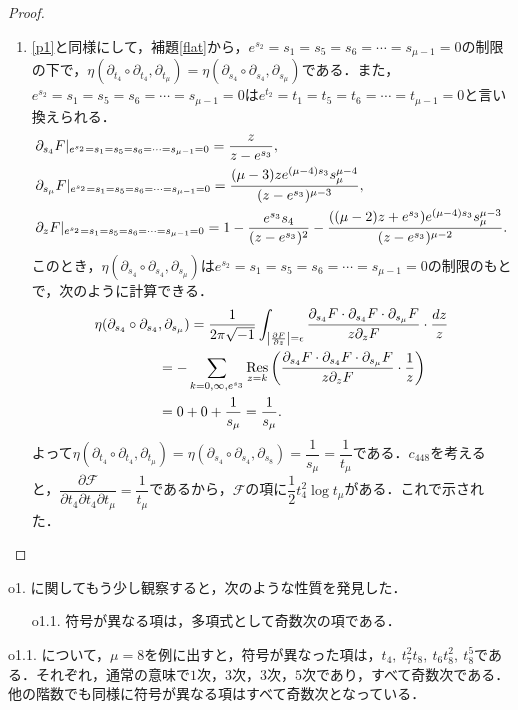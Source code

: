 \documentclass[a4paper,11pt]{jbook}
\theoremstyle{plain}
\theoremstyle{definition}
\theoremstyle{remark}
\theoremstyle{proof}
\numberwithin{equation}{section}
\def\F{{\mathcal F}}
\def\p{{\partial }}
\def\p{\partial }
\newcommand{\Res}{\mathop{\rm Res}}
\begin{document}
\begin{proof}
\begin{enumerate}
	\item \ref{p1}と同様にして，補題\ref{flat}から，$e^{s_2}=s_1=s_5=s_6=\cdots=s_{\mu-1}=0$の制限の下で，$\eta(\p_{t_4} \circ \p_{t_4}, \p_{t_\mu})=\eta(\p_{s_4}\circ\p_{s_4}, \p_{s_\mu})$である．また，$e^{s_2}=s_1=s_5=s_6=\cdots=s_{\mu-1}=0$は$e^{t_2}=t_1=t_5=t_6=\cdots=t_{\mu-1}=0$と言い換えられる．
\begin{align}
&\p_{s_4}F|_{e^{s_2}=s_1=s_5=s_6=\cdots=s_{\mu-1}=0}=\dfrac{z}{z-e^{s_3}}, \notag \\
&\p_{s_\mu}F|_{e^{s_2}=s_1=s_5=s_6=\cdots=s_{\mu-1}=0}=\dfrac{(\mu-3)ze^{(\mu-4)s_3}s_\mu^{\mu-4}}{(z-e^{s_3})^{\mu-3}}, \notag \\
&\p_{z}F|_{e^{s_2}=s_1=s_5=s_6=\cdots=s_{\mu-1}=0}=1-\frac{e^{s_3}s_4}{(z-e^{s_3})^2}-\frac{((\mu-2)z+e^{s_3})e^{(\mu-4)s_3}s_\mu^{\mu-3}}{(z-e^{s_3})^{\mu-2}}. \notag
\end{align}
このとき，$\eta(\p_{s_4}\circ\p_{s_4}, \p_{s_\mu})$は$e^{s_2}=s_1=s_5=s_6=\cdots=s_{\mu-1}=0$の制限のもとで，次のように計算できる．
\begin{align}
	\eta(\p_{s_4}\circ\p_{s_4}&, \p_{s_\mu}) = \dfrac{1}{2\pi\sqrt{-1}}\int_{\left|\frac{\partial F}{\partial z}\right|=\epsilon}\dfrac{\partial_{s_4}F\cdot\partial_{s_4}F\cdot\partial_{s_\mu}F}{z\partial_zF}\cdot\dfrac{dz}{z} \notag \\
&= -\sum_{k=0, \infty, e^{s_3}}\Res_{z=k} \left(\dfrac{\partial_{s_4}F\cdot\partial_{s_4}F\cdot\partial_{s_\mu}F}{z\partial_zF}\cdot\dfrac{1}{z}\right) \notag \\
&= 0 + 0 + \frac{1}{s_\mu} \notag 
= \frac{1}{s_\mu}.
\end{align}
よって$\eta(\p_{t_4} \circ \p_{t_4}, \p_{t_\mu})=\eta(\p_{s_4}\circ\p_{s_4}, \p_{s_8})=\dfrac{1}{s_\mu}=\dfrac{1}{t_\mu}$である．$c_{448}$を考えると，$\dfrac{\p \F}{\p t_4\p t_4\p t_\mu} = \dfrac{1}{t_\mu}$であるから，$\F$の項に$\dfrac{1}{2}t_4^2\log{t_\mu}$がある．これで示された．
\end{enumerate}
\end{proof}

	o1. に関してもう少し観察すると，次のような性質を発見した．
\begin{enumerate}
\item[o1.1.] 符号が異なる項は，多項式として奇数次の項である．
\end{enumerate}

\noindent o1.1. について，$\mu=8$を例に出すと，符号が異なった項は，$t_4,\ t_7^2t_8,\ t_6t_8^2,\ t_8^5$である．それぞれ，通常の意味で$1$次，$3$次，$3$次，$5$次であり，すべて奇数次である．他の階数でも同様に符号が異なる項はすべて奇数次となっている．
\end{document}
